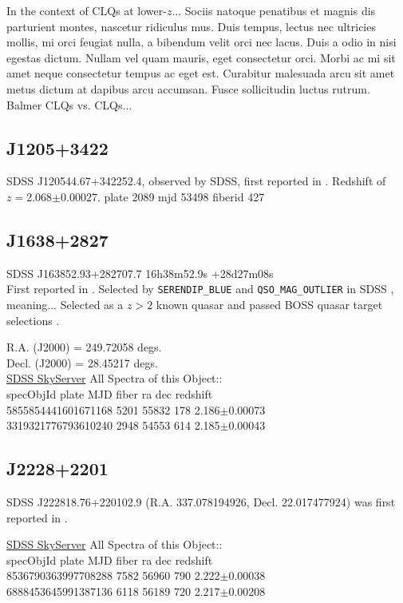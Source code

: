 \documentclass[a4paper,fleqn,usenatbib]{mnras}
\begin{document}
In the context of CLQs at lower-$z$...  Sociis natoque penatibus et
magnis dis parturient montes, nascetur ridiculus mus. Duis tempus,
lectus nec ultricies mollis, mi orci feugiat nulla, a bibendum velit
orci nec lacus. Duis a odio in nisi egestas dictum. Nullam vel quam
mauris, eget consectetur orci. Morbi ac mi sit amet neque consectetur
tempus ac eget est. Curabitur malesuada arcu sit amet metus dictum at
dapibus arcu accumsan. Fusce sollicitudin luctus rutrum.  Balmer CLQs
vs. \civ CLQs...


\subsection{J1205+3422 }
SDSS J120544.67+342252.4, observed by SDSS, first reported in \citet{Schneider2007}. 
Redshift of $z=$2.068$\pm$0.00027. 
plate	2089 
mjd	53498
fiberid	427


\subsection{J1638+2827}
SDSS J163852.93+282707.7       16h38m52.9s +28d27m08s  \\
First reported in \citet{Schneider2010}. 
Selected by {\tt SERENDIP\_BLUE} and {\tt QSO\_MAG\_OUTLIER} in SDSS \citep{Richards2002}, meaning...
Selected as a $z>2$ known quasar and passed BOSS quasar target selections \citep{Ross2012}. 


R.A. (J2000) = 249.72058 degs. \\
Decl. (J2000) = 28.45217 degs. \\
\href{skyserver.sdss.org/dr15/en/tools/explore/Summary.aspx?id=1237662301375824232}{SDSS SkyServer} 
All Spectra of this Object:: \\
specObjId	plate	MJD	fiber	ra	dec	redshift \\
5855854441601671168	5201	55832	178	2.186$\pm$0.00073\\
3319321776793610240	2948	54553	614	2.185$\pm$0.00043\\


\subsection{J2228+2201}
SDSS J222818.76+220102.9 (R.A. 337.078194926, Decl. 22.017477924) was first reported in 
\citet{Paris2017}. 

\href{skyserver.sdss.org/dr15/en/tools/explore/summary.aspx?id=1237678579819479655}{SDSS SkyServer}
All Spectra of this Object:: \\
specObjId	plate	MJD	fiber	ra	dec	redshift \\
8536790363997708288	7582	56960	790	2.222$\pm$0.00038\\
6888453645991387136	6118	56189	720	2.217$\pm$0.00208\\
\end{document}
